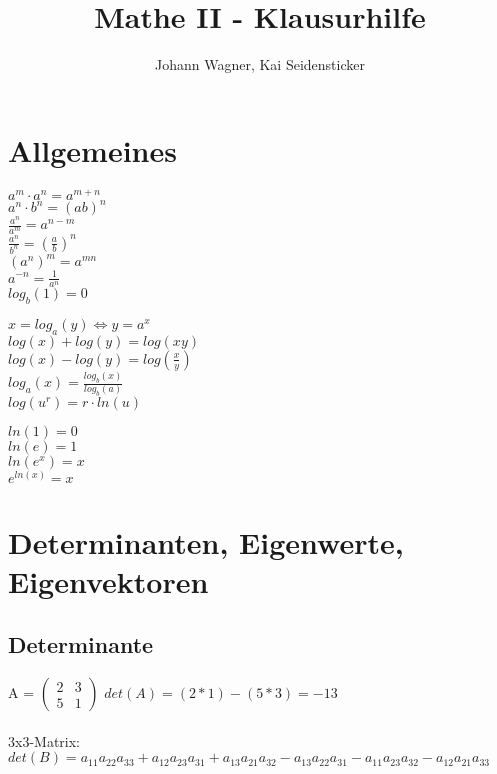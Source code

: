 \documentclass[a4paper,landscape, 11pt]{article}
\author{Johann Wagner, Kai Seidensticker}
\title{Mathe II - Klausurhilfe}
\begin{document}
    \begin{multicols}{4}
        
    
    \begin{small}
    \section{Allgemeines}
        \begin{multicols}{2}
        $a^m \cdot a^n = a^{m+n}$\\
        $a^n \cdot b^n = (ab)^n$\\
        $\frac{a^n}{a^m} = a^{n-m}$\\
        $\frac{a^n}{b^n} = \left(\frac{a}{b}\right)^n$\\
        $(a^n)^m = a^{mn}$\\
        $a^{-n} = \frac{1}{a^n}$\\
        $log_b(1) = 0$
        \end{multicols}
        \noindent
        $x = log_a(y) \Leftrightarrow y = a^x$\\
        $log(x) + log(y) = log(xy)$\\
        $log(x) - log(y) = log(\frac{x}{y})$\\
        $log_a(x) = \frac{log_b(x)}{log_b(a)}$  \\
        $log(u^r) = r \cdot ln(u)$
        \begin{multicols}{2}
        \noindent
        $ln(1) = 0$ \\
        $ln(e) = 1$ \\
        $ln(e^x) = x$ \\
        $e^{ln(x)} = x$
        \end{multicols}
    \section{Determinanten, Eigenwerte, Eigenvektoren}
        \subsection{Determinante}
        A = $\left(
        \begin{matrix}
            2 & 3 \\
            5 & 1
        \end{matrix}
        \right)$ \hspace{2pt} 
        $det(A) = (2*1) - (5*3) = -13$ \\ \\
        3x3-Matrix:\\
        $det(B) = a_{11} a_{22} a_{33} + a_{12} a_{23} a_{31} + a_{13} a_{21} a_{32} - a_{13} a_{22} a_{31} - a_{11} a_{23} a_{32} - a_{12} a_{21} a_{33}$  
        

\end{small}
\end{multicols}
\end{document}
